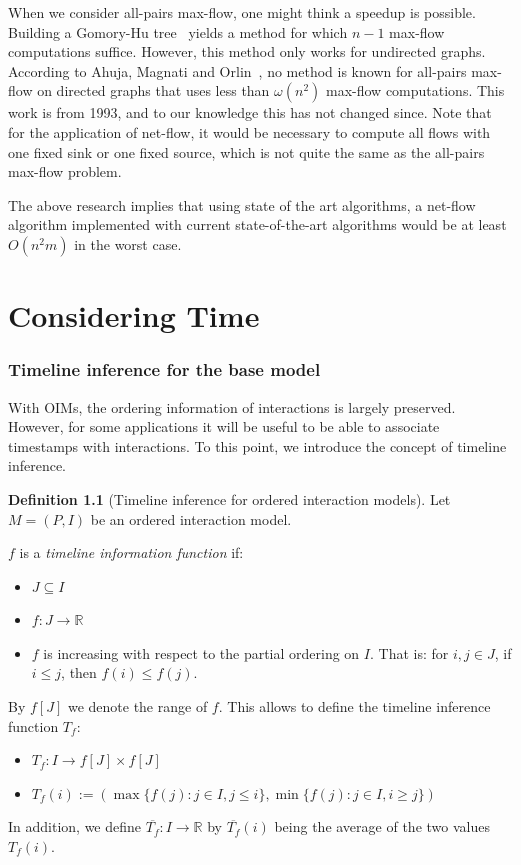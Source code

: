 \documentclass[a4paper,11pt]{book}
\newcommand{\bb}{\mathbb}
\newcommand{\ov}{\overline}
\theoremstyle{definition}
\newtheorem{definition}{Definition}
\begin{document}
When we consider all-pairs max-flow, one might think a speedup is possible. 
Building a Gomory-Hu tree~\cite{gomory1961multi} yields a method
for which $n-1$ max-flow computations suffice. However, this method only works for undirected graphs.
According to Ahuja, Magnati and Orlin~\cite{ahuja1993network}, no method is known for all-pairs max-flow
on directed graphs that uses less than $\omega(n^2)$ max-flow computations. This work is from
1993, and to our knowledge this has not changed since. Note that for the application of
net-flow, it would be necessary to compute all flows with one fixed sink or one fixed source,
which is not quite the same as the all-pairs max-flow problem.

The above research implies that using state of the art algorithms, a net-flow algorithm
implemented with current state-of-the-art algorithms would be at least $O(n^2m)$ in the
worst case. 




\chapter{Considering Time}
\label{chap:temporal_pr}
\subsection{Timeline inference for the base model}

With OIMs, the ordering information of interactions is largely preserved. However, for some
applications it will be useful to be able to associate timestamps with interactions. To
this point, we introduce the concept of timeline inference.

\begin{definition}[Timeline inference for ordered interaction models]
    Let $M = (P, I)$ be an ordered interaction model. 

    $f$ is a \emph{timeline information function} if:
    \begin{itemize}
        \item $J \subseteq I$ 
        \item $f : J \to \bb{R}$
        \item $f$ is increasing with respect to the partial ordering on $I$. That is:
            for $i,j \in J$, if $i \leq j$, then $f(i) \leq f(j)$. 
    \end{itemize}

    By $f[J]$ we denote the range of $f$.
    This allows to define the timeline inference function $T_f$:

    \begin{itemize}
        \item $T_f : I \to f[J] \times f[J]$
        \item $T_f(i) := (\max \{f(j): j \in I, j \leq i\}, \min \{f(j) : j \in I, i \geq j\})$
    \end{itemize}
    
    In addition, we define $\ov{T_f} : I \to \bb{R}$ by $\ov{T_f}(i)$ being the average of the
    two values $T_f(i)$.
\end{definition}
\end{document}

